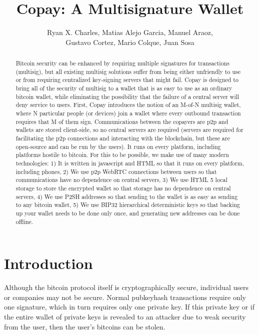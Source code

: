 \documentclass{article}
\begin{document}
\pagestyle{headings}
\title{Copay: A Multisignature Wallet}
\author{
Ryan X. Charles,
Matias Alejo Garcia,
Manuel Araoz,\\
Gustavo Cortez,
Mario Colque,
Juan Sosa
}
\date{}
\maketitle
\begin{abstract}
Bitcoin security can be enhanced by requiring multiple signatures for transactions (multisig), but all existing multisig solutions suffer from being either unfriendly to use or from requiring centralized key-signing servers that might fail.
Copay is designed to bring all of the security of multisig to a wallet that is as easy to use as an ordinary bitcoin wallet, while eliminating the possibility that the failure of a central server will deny service to users.
First, Copay introduces the notion of an M-of-N multisig wallet, where N particular people (or devices) join a wallet where every outbound transaction requires that M of them sign.
Communications between the copayers are p2p and wallets are stored client-side, so no central servers are required (servers are required for facilitating the p2p connections and interacting with the blockchain, but these are open-source and can be run by the users).
It runs on every platform, including platforms hostile to bitcoin.
For this to be possible, we make use of many modern technologies:
1) It is written in javascript and HTML so that it runs on every platform, including phones,
2) We use p2p WebRTC connections between users so that communications have no dependence on central servers,
3) We use HTML 5 local storage to store the encrypted wallet so that storage has no dependence on central servers,
4) We use P2SH addresses so that sending to the wallet is as easy as sending to any bitcoin wallet,
5) We use BIP32 hierarchical deterministic keys so that backing up your wallet needs to be done only once, and generating new addresses can be done offline.
\end{abstract}

\section{Introduction}

Although the bitcoin protocol itself is cryptographically secure, individual users or companies may not be secure.
Normal pubkeyhash transactions require only one signature, which in turn requires only one private key.
If this private key or if the entire wallet of private keys is revealed to an attacker due to weak security from the user, then the user's bitcoins can be stolen.
\end{document}
